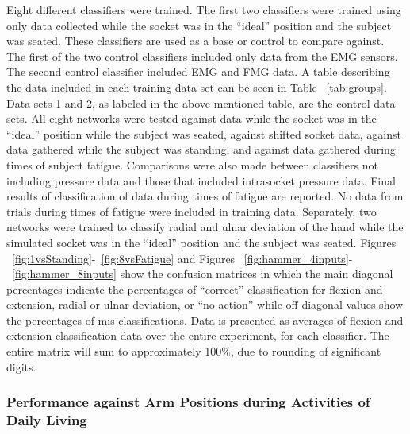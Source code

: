 \documentclass[twocolumn]{sagej}
\begin{document}
Eight different classifiers were trained.  The first two classifiers were trained using only data collected while the socket was in the ``ideal'' position and the subject was seated. These classifiers are used as a base or control to compare against. The first of the two control classifiers included only data from the EMG sensors.  The second control classifier included EMG and FMG data.  A table describing the data included in each training data set can be seen in Table ~\ref{tab:groups}.  Data sets 1 and 2, as labeled in the above mentioned table, are the control data sets.  All eight networks were tested against data while the socket was in the ``ideal'' position while the subject was seated, against shifted socket data, against data gathered while the subject was  standing, and against data gathered during times of subject fatigue.  Comparisons were also made between classifiers not including pressure data and those that included intrasocket pressure data.  Final results of classification of data during times of fatigue are reported.  No data from trials during times of fatigue were included in training data.  Separately, two networks were trained to classify radial and ulnar deviation of the hand while the simulated socket was in the ``ideal'' position and the subject was seated. Figures ~\ref{fig:1vsStanding}-~\ref{fig:8vsFatigue} and Figures ~\ref{fig:hammer_4inputs}-~\ref{fig:hammer_8inputs} show the confusion matrices in which the main diagonal percentages indicate the percentages of ``correct'' classification for flexion and extension, radial or ulnar deviation, or ``no action'' while off-diagonal values show the percentages of mis-classifications. Data is presented as averages of flexion and extension classification data over the entire experiment, for each classifier.  The entire matrix will sum to approximately 100$\%$, due to rounding of significant digits.  

\subsubsection{Performance against Arm Positions during Activities of Daily Living}
\label{sec:res_arm}

\begin{comment}
Data comparing different training data sets to Standing

ideal, standing, shift -> standing
ideal, shift -> standing
ideal, standing -> standing
ideal -> standing
\end{comment}
\end{document}

